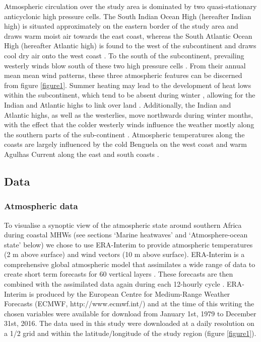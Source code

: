 \documentclass[utf8]{frontiersSCNS}
\begin{document}
Atmospheric circulation over the study area is dominated by two quasi-stationary anticyclonic high pressure cells. The South Indian Ocean High (hereafter Indian high) is situated approximately on the eastern border of the study area and draws warm moist air towards the east coast, whereas the South Atlantic Ocean High (hereafter Atlantic high) is found to the west of the subcontinent and draws cool dry air onto the west coast \citep{vanHeerden1998}. To the south of the subcontinent, prevailing westerly winds blow south of these two high pressure cells \citep{vanHeerden1998}. From their annual mean mean wind patterns, these three atmospheric features can be discerned from figure \ref{figure1}. Summer heating may lead to the development of heat lows within the subcontinent, which tend to be absent during winter \citep{Tyson2000}, allowing for the Indian and Atlantic highs to link over land \citep{vanHeerden1998}. Additionally, the Indian and Atlantic highs, as well as the westerlies, move northwards during winter months, with the effect that the colder westerly winds influence the weather mostly along the southern parts of the sub-continent \citep{vanHeerden1998}. Atmospheric temperatures along the coasts are largely influenced by the cold Benguela on the west coast and warm Agulhas Current along the east and south coasts \citep{vanHeerden1998}.




\subsection{Data}
\subsubsection{Atmospheric data}
To visualise a synoptic view of the atmospheric state around southern Africa during coastal MHWs (see sections `Marine heatwaves' and `Atmosphere-ocean state' below) we chose to use ERA-Interim to provide atmospheric temperatures (2 m above surface) and wind vectors (10 m above surface). ERA-Interim is a comprehensive global atmospheric model that assimilates a wide range of data to create short term forecasts for 60 vertical layers \citep{Dee2011}. These forecasts are then combined with the assimilated data again during each 12-hourly cycle \citep{Dee2011}. ERA-Interim is produced by the European Centre for Medium-Range Weather Forecasts (ECMWF, http://www.ecmwf.int/) and at the time of this writing the chosen variables were available for download from January 1st, 1979 to December 31st, 2016. The data used in this study were downloaded at a daily resolution on a 1/2\degree \: grid and within the latitude/longitude of the study region (figure \ref{figure1}).
\end{document}
